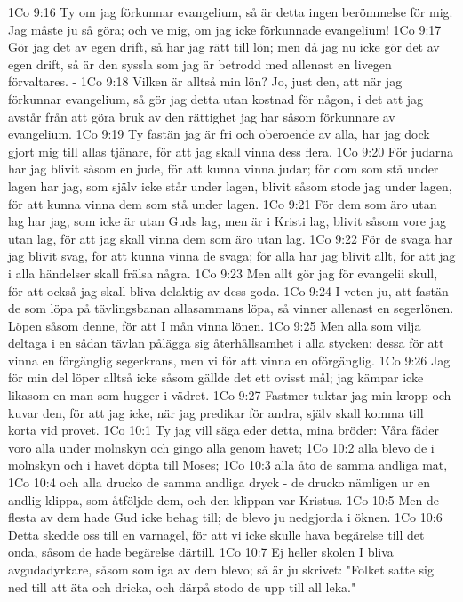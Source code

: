 1Co 9:16  Ty om jag förkunnar evangelium, så är detta ingen berömmelse för mig. Jag måste ju så göra; och ve mig, om jag icke förkunnade evangelium!
1Co 9:17  Gör jag det av egen drift, så har jag rätt till lön; men då jag nu icke gör det av egen drift, så är den syssla som jag är betrodd med allenast en livegen förvaltares. -
1Co 9:18  Vilken är alltså min lön? Jo, just den, att när jag förkunnar evangelium, så gör jag detta utan kostnad för någon, i det att jag avstår från att göra bruk av den rättighet jag har såsom förkunnare av evangelium.
1Co 9:19  Ty fastän jag är fri och oberoende av alla, har jag dock gjort mig till allas tjänare, för att jag skall vinna dess flera.
1Co 9:20  För judarna har jag blivit såsom en jude, för att kunna vinna judar; för dom som stå under lagen har jag, som själv icke står under lagen, blivit såsom stode jag under lagen, för att kunna vinna dem som stå under lagen.
1Co 9:21  För dem som äro utan lag har jag, som icke är utan Guds lag, men är i Kristi lag, blivit såsom vore jag utan lag, för att jag skall vinna dem som äro utan lag.
1Co 9:22  För de svaga har jag blivit svag, för att kunna vinna de svaga; för alla har jag blivit allt, för att jag i alla händelser skall frälsa några.
1Co 9:23  Men allt gör jag för evangelii skull, för att också jag skall bliva delaktig av dess goda.
1Co 9:24  I veten ju, att fastän de som löpa på tävlingsbanan allasammans löpa, så vinner allenast en segerlönen. Löpen såsom denne, för att I mån vinna lönen.
1Co 9:25  Men alla som vilja deltaga i en sådan tävlan pålägga sig återhållsamhet i alla stycken: dessa för att vinna en förgänglig segerkrans, men vi för att vinna en oförgänglig.
1Co 9:26  Jag för min del löper alltså icke såsom gällde det ett ovisst mål; jag kämpar icke likasom en man som hugger i vädret.
1Co 9:27  Fastmer tuktar jag min kropp och kuvar den, för att jag icke, när jag predikar för andra, själv skall komma till korta vid provet.
1Co 10:1  Ty jag vill säga eder detta, mina bröder: Våra fäder voro alla under molnskyn och gingo alla genom havet;
1Co 10:2  alla blevo de i molnskyn och i havet döpta till Moses;
1Co 10:3  alla åto de samma andliga mat,
1Co 10:4  och alla drucko de samma andliga dryck - de drucko nämligen ur en andlig klippa, som åtföljde dem, och den klippan var Kristus.
1Co 10:5  Men de flesta av dem hade Gud icke behag till; de blevo ju nedgjorda i öknen.
1Co 10:6  Detta skedde oss till en varnagel, för att vi icke skulle hava begärelse till det onda, såsom de hade begärelse därtill.
1Co 10:7  Ej heller skolen I bliva avgudadyrkare, såsom somliga av dem blevo; så är ju skrivet: "Folket satte sig ned till att äta och dricka, och därpå stodo de upp till all leka."
